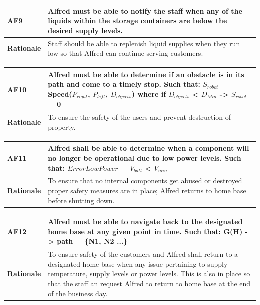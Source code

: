\documentclass [11pt]{article}
\begin{document}
\begin{longtable}{| p{ } | p{ } | }\hline 
\rowcolor{tableCell}\textbf{AF9} & Alfred must be able to notify the staff when any of the liquids within the storage containers are below the desired supply levels. \\ \hline 
\textbf{Rationale} &  Staff should be able to replenish liquid supplies when they run low so that Alfred can continue serving customers. \\ \hline
\end{longtable}

\begin{longtable}{| p{ } | p{ } | }\hline 
\rowcolor{tableCell}\textbf{AF10} & Alfred must be able to determine if an obstacle is in its path and come to a timely stop. Such that: $S_{robot}$ = Speed($P_{right}$, $P_{left}$, $D_{objects}$) where if $D_{objects}$ < $D_{Min}$ -> $S_{robot}$ = 0 \\ \hline
\textbf{Rationale} &  To ensure the safety of the users and prevent destruction of property. \\ \hline 
\end{longtable}

\begin{longtable}{| p{ } | p{ } | }\hline 
\rowcolor{tableCell}\textbf{AF11} & Alfred shall be able to determine when a component will no longer be operational due to low power levels. Such that: $ErrorLowPower$ = $V_{batt}$ < $V_{min}$ \\ \hline
\textbf{Rationale} &  To ensure that no internal components get abused or destroyed proper safety measures are in place; Alfred returns to home base before shutting down. \\ \hline
\end{longtable}

\begin{longtable}{| p{ } | p{ } | }\hline 
\rowcolor{tableCell}\textbf{AF12} & Alfred must be able to navigate back to the designated home base at any given point in time. Such that: G(H) -> path = \{N1, N2 ...\} \\ \hline
\textbf{Rationale} &  To ensure safety of the customers and Alfred shall return to a designated home base when any issue pertaining to supply temperature, supply levels or power levels. This is also in place so that the staff an request Alfred to return to home base at the end of the business day. \\ \hline
\end{longtable}
\end{document}
